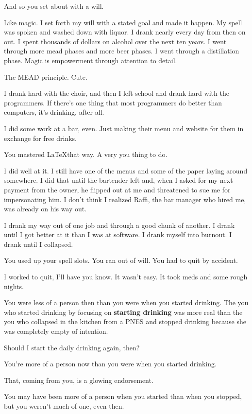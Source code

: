 \begin{paracol}{2}
\begin{leftcolumn}
\begin{ally}
And so you set about with a will.
\end{ally}
Like magic. I set forth my will with a stated goal and made it happen. My spell was spoken and washed down with liquor. I drank nearly every day from then on out. I spent thousands of dollars on alcohol over the next ten years. I went through more mead phases and more beer phases. I went through a distillation phase. Magic is empowerment through attention to detail.

\begin{ally}
The MEAD principle. Cute.
\end{ally}
I drank hard with the choir, and then I left school and drank hard with the programmers. If there's one thing that most programmers do better than computers, it's drinking, after all.

I did some work at a bar, even. Just making their menu and website for them in exchange for free drinks.

\begin{ally}
You mastered \LaTeX that way. A very you thing to do.
\end{ally}
I did well at it. I still have one of the menus and some of the paper laying around somewhere. I did that until the bartender left and, when I asked for my next payment from the owner, he flipped out at me and threatened to sue me for impersonating him. I don't think I realized Raffi, the bar manager who hired me, was already on his way out.

I drank my way out of one job and through a good chunk of another. I drank until I got better at it than I was at software. I drank myself into burnout. I drank until I collapsed.

\begin{ally}
You used up your spell slots. You ran out of will. You had to quit by accident.
\end{ally}
I worked to quit, I'll have you know. It wasn't easy. It took meds and some rough nights.

\begin{ally}
You were less of a person then than you were when you started drinking. The you who started drinking by focusing on \textbf{starting drinking} was more real than the you who collapsed in the kitchen from a PNES and stopped drinking because she was completely empty of intention.
\end{ally}
Should I start the daily drinking again, then?

\begin{ally}
You're more of a person now than you were when you started drinking.
\end{ally}
That, coming from you, is a glowing endorsement.

\begin{ally}
You may have been more of a person when you started than when you stopped, but you weren't much of one, even then.
\end{ally}
\newpage
\end{leftcolumn}
\end{paracol}
